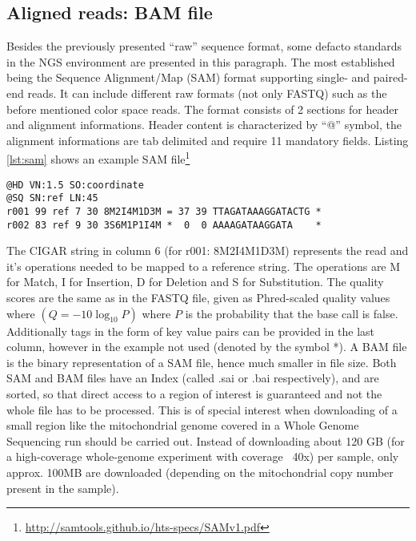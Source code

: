 \subsection{Aligned reads: BAM file}
Besides the previously presented "`raw"' sequence format, some defacto standards in the NGS environment are presented in this paragraph. The most established being the Sequence Alignment/Map (SAM) format \cite{Li2009} supporting single- and paired-end reads. It can include different raw formats (not only FASTQ) such as the before mentioned color space reads. The format consists of 2 sections for header and alignment informations. Header content is characterized by "`@"' symbol, the alignment informations are tab delimited and require 11 mandatory fields. Listing \ref{lst:sam} shows an example SAM file\footnote{\url{http://samtools.github.io/hts-specs/SAMv1.pdf}} 
\begin{lstlisting}[caption= {Excerpt of a SAM file, representing two reads, r001 and r002}, label={lst:sam}]
@HD VN:1.5 SO:coordinate
@SQ SN:ref LN:45
r001 99 ref 7 30 8M2I4M1D3M = 37 39 TTAGATAAAGGATACTG *
r002 83 ref 9 30 3S6M1P1I4M *  0  0 AAAAGATAAGGATA    *
\end{lstlisting}
The CIGAR string in column 6 (for r001: 8M2I4M1D3M) represents the read and it's operations needed to be mapped to a reference string. The operations are M for Match, I for Insertion, D for Deletion and S for Substitution. 
The quality scores are the same as in the FASTQ file, given as Phred-scaled quality values where $\left( Q=-10\log_{10} P\right)$ where $P$ is the probability that the base call is false\cite{Loman2012}. Additionally tags in the form of key value pairs can be provided in the last column, however in the example not used (denoted by the symbol *).
A BAM file is the binary representation of a SAM file, hence much smaller in file size. Both SAM and BAM files have an Index (called .sai or .bai respectively), and are sorted, so that direct access to a region of interest is guaranteed and not the whole file has to be processed. This is of special interest when downloading of a small region like the mitochondrial genome covered in a Whole Genome Sequencing run should be carried out. Instead of downloading about 120 GB (for a high-coverage whole-genome experiment with coverage ~40x) per sample, only approx. 100MB are downloaded (depending on the mitochondrial copy number present in the sample).
